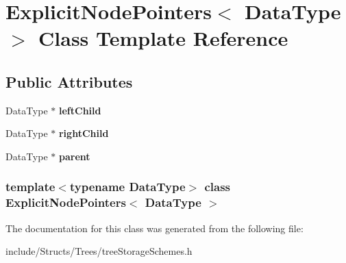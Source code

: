 \hypertarget{class_explicit_node_pointers}{
\section{ExplicitNodePointers$<$ DataType $>$ Class Template Reference}
\label{class_explicit_node_pointers}
}
\subsection*{Public Attributes}
\begin{DoxyCompactItemize}
\item 
\hypertarget{class_explicit_node_pointers_aedd9f45ace5d1b0b27c15d99c7a217fc}{
DataType $\ast$ {\bfseries leftChild}}
\label{class_explicit_node_pointers_aedd9f45ace5d1b0b27c15d99c7a217fc}

\item 
\hypertarget{class_explicit_node_pointers_a898bf75999bdf988377cea8a3f458c75}{
DataType $\ast$ {\bfseries rightChild}}
\label{class_explicit_node_pointers_a898bf75999bdf988377cea8a3f458c75}

\item 
\hypertarget{class_explicit_node_pointers_ad3924962a6ea2ee160885d8b35588e15}{
DataType $\ast$ {\bfseries parent}}
\label{class_explicit_node_pointers_ad3924962a6ea2ee160885d8b35588e15}

\end{DoxyCompactItemize}
\subsubsection*{template$<$typename DataType$>$ class ExplicitNodePointers$<$ DataType $>$}



The documentation for this class was generated from the following file:\begin{DoxyCompactItemize}
\item 
include/Structs/Trees/treeStorageSchemes.h\end{DoxyCompactItemize}
